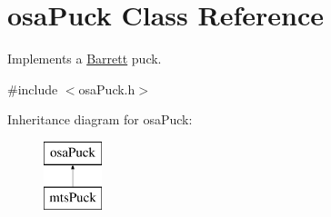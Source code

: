\hypertarget{classosa_puck}{}\section{osa\+Puck Class Reference}
\label{classosa_puck}


Implements a \hyperlink{struct_barrett}{Barrett} puck.  




{\ttfamily \#include $<$osa\+Puck.\+h$>$}

Inheritance diagram for osa\+Puck\+:\begin{figure}[H]
\begin{center}
\leavevmode
\includegraphics[height=2.000000cm]{d0/dfa/classosa_puck}
\end{center}
\end{figure}
